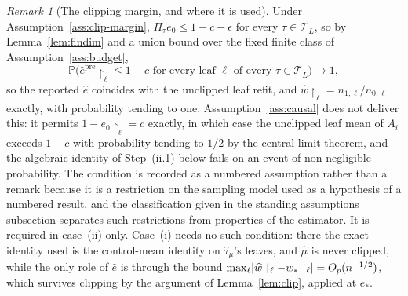 \documentclass[11pt]{article}
\theoremstyle{plain}
\theoremstyle{definition}
\theoremstyle{remark}
\newtheorem{remark}[theorem]{Remark}
\newcommand{\PP}{\mathbb{P}}
\newcommand{\cT}{\mathcal{T}}
\newcommand{\ez}{e_0}
\newcommand{\ehat}{\widehat{e}}
\newcommand{\mhat}{\widehat{\mu}}
\newcommand{\what}{\widehat{w}}
\newcommand{\that}{\widehat{\tau}}
\DeclarePairedDelimiter{\abs}{\lvert}{\rvert}
\begin{document}
\begin{remark}[The clipping margin, and where it is used]\label{rem:clip-margin}
Under Assumption~\ref{ass:clip-margin}, $\Pi_\tau\ez\le1-c-\epsilon$ for every
$\tau\in\cT_{\bar L}$, so by Lemma~\ref{lem:findim} and a union bound over the
fixed finite class of Assumption~\ref{ass:budget},
\[
  \PP\bigl(\ehat^{\mathrm{pre}}\restriction_\ell\le1-c
   \text{ for every leaf }\ell\text{ of every }\tau\in\cT_{\bar L}\bigr)
  \longrightarrow1 ,
\]
so the reported $\ehat$ coincides with the unclipped leaf refit, and
$\what\restriction_\ell=n_{1,\ell}/n_{0,\ell}$ exactly, with probability tending
to one. Assumption~\ref{ass:causal} does not deliver this: it permits
$1-\ez\restriction_\ell=c$ exactly, in which case the unclipped leaf mean of
$A_i$ exceeds $1-c$ with probability tending to $1/2$ by the central limit
theorem, and the algebraic identity of Step~(ii.1) below fails on an event of
non-negligible probability. The condition is recorded as a numbered assumption
rather than a remark because it is a restriction on the sampling model used as a
hypothesis of a numbered result, and the classification given in the standing
assumptions subsection separates such restrictions from properties of the
estimator. It is required in case~(ii) only. Case~(i) needs no such condition:
there the exact identity used is the control-mean identity on $\that_\mu$'s
leaves, and $\mhat$ is never clipped, while the only role of $\ehat$ is through
the bound $\max_\ell\abs{\what\restriction_\ell-w_*\restriction_\ell}
=O_p(n^{-1/2})$, which survives clipping by the argument of
Lemma~\ref{lem:clip}, applied at $e_*$.
\end{remark}
\end{document}
